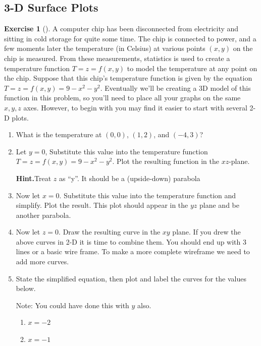 \documentclass[10pt,]{book}
\theoremstyle{plain}
\theoremstyle{definition}
\theoremstyle{definition}
\theoremstyle{definition}
\theoremstyle{definition}
\newtheorem{exploration}[project]{Exercise}
\theoremstyle{definition}
\numberwithin{equation}{section}
\begin{document}
\subsection[{3-D Surface Plots}]{3-D Surface Plots}\label{subsection-25}
\begin{exploration}[]\label{prob_3dsurface_plot}
A computer chip has been disconnected from electricity and sitting in cold storage for quite some time. The chip is connected to power, and a few moments later the temperature (in Celsius) at various points \((x,y)\) on the chip is measured. From these measurements, statistics is used to create a temperature function \(T=z=f(x,y)\) to model the temperature at any point on the chip. Suppose that this chip's temperature function is given by the equation \(T=z=f(x,y)=9-x^2-y^2\). Eventually we'll be creating a 3D model of this function in this problem, so you'll need to place all your graphs on the same \(x,y,z\) axes. However, to begin with you may find it easier to start with several 2-D plots.%
\begin{enumerate}[font=\bfseries,label=(\alph*),ref=\alph*]
\item\label{task-200} What is the temperature at \((0,0)\), \((1,2)\), and \((-4,3)\)?%
\item\label{task-201} Let \(y=0\), Substitute this value into the temperature function \(T=z=f(x,y)=9-x^2-y^2\). Plot the resulting function in the \(xz\)-plane.%
\par\medskip\noindent%
\textbf{Hint.}\quad Treat \(z\) as ``y''. It should be a (upside-down) parabola%
\item\label{task-202} Now let \(x=0\). Substitute this value into the temperature function and simplify. Plot the result. This plot should appear in the \(yz\) plane and be another parabola.%
\item\label{task-203} Now let \(z=0\). Draw the resulting curve in the \(xy\) plane. If you drew the above curves in 2-D it is time to combine them. You should end up with 3 lines or a basic wire frame. To make a more complete wireframe we need to add more curves.%
\item\label{task-204} State the simplified equation, then plot and label the curves for the values below.%
\par
Note: You could have done this with \(y\) also.%
\begin{enumerate}[font=\bfseries,label=(\roman*),ref=\theenumi.\roman*]
\item\label{task-205} \(x=-2\)%
\item\label{task-206} \(x=-1\)%

\end{enumerate}
\end{enumerate}
\end{exploration}
\end{document}
